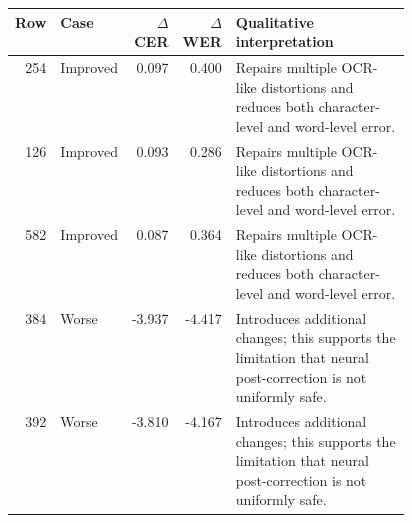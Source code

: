 \begin{tabular}{|r|l|r|r|p{0.46\linewidth}|}
\hline
Row & Case & $\Delta$CER & $\Delta$WER & Qualitative interpretation \\
\hline
254 & Improved & 0.097 & 0.400 & Repairs multiple OCR-like distortions and reduces both character-level and word-level error. \\
\hline
126 & Improved & 0.093 & 0.286 & Repairs multiple OCR-like distortions and reduces both character-level and word-level error. \\
\hline
582 & Improved & 0.087 & 0.364 & Repairs multiple OCR-like distortions and reduces both character-level and word-level error. \\
\hline
384 & Worse & -3.937 & -4.417 & Introduces additional changes; this supports the limitation that neural post-correction is not uniformly safe. \\
\hline
392 & Worse & -3.810 & -4.167 & Introduces additional changes; this supports the limitation that neural post-correction is not uniformly safe. \\
\hline
\end{tabular}
